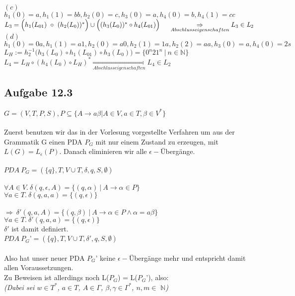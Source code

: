 \documentclass[11pt,a4paper]{article}
\begin{document}
$(c)$\\
$h_1(0) = a, h_1(1) = bb, h_2(0) = c, h_3(0) = a, h_4(0) = b, h_4(1) = cc$\\
$L_3 = \Big(h_1(L_{01}) ~ \circ ~ (h_2(L_0))^*\Big) \cup \Big((h_3(L_0))^* \circ h_4(L_{01})\Big) \\
\\
	~~~~ \underset{Abschlusseigenschaften} {\Rightarrow} L_3 \in \textit{L}_2$\\

$(d)$\\
$h_1(0) = 0a, h_1(1) = a1, h_2(0) = a0, h_2(1) = 1a, h_2(2) = aa, h_3(0) = a, h_4(0) = 2s$ \\
$L_H := h_2^{-1} \Big( h_3(L_0) \circ h_1(L_{01}) \circ h_3(L_0) \Big) = \Big\{0^n 2 1^n ~ | ~ n \in \mathbb N \Big\}$ \\
$L_4 = L_H \circ (h_4(L_0) \circ L_H)^* \underset{Abschlusseigenschaften} {\Rightarrow} L_4 \in \textit{L}_2$

\newpage

\subsection*{Aufgabe 12.3}
$G = (V, T, P, S), P \subseteq \{ A \rightarrow a\beta | A \in V, a \in T, \beta \in V^* \} $\\
\\
Zuerst benutzen wir das in der Vorlesung vorgestellte Verfahren um aus der Grammatik G einen 
PDA $P_G$ mit nur einem Zustand zu erzeugen, mit $L(G) = L_\epsilon(P)$. Danach eliminieren wir alle $\epsilon -$Übergänge. \\
\\
$PDA ~ P_G = ( \{q\}, T, V \cup T, \delta, q, S, \emptyset) $ \\
\\
$ \forall A \in V. ~ \delta(q,\epsilon,A) = \{(q,\alpha) ~ | ~ A \rightarrow \alpha \in P\} $ \\
$ \forall a \in T. ~ \delta(q,a,a) = \{(q,\epsilon)\} $ \\
\\
$ \Rightarrow ~ \delta'(q,a,A) = \{(q,\beta) ~ | ~ A \rightarrow \alpha \in P \wedge \alpha = a\beta \} $ \\
$ \forall a \in T. ~ \delta'(q,a,a) = \{(q,\epsilon)\} $ \\
$\delta'$ ist damit definiert.
\\
$PDA ~ P_G$'$ = ( \{q\}, T, V \cup T, \delta', q, S, \emptyset) $ \\
\\
Also hat unser neuer PDA $P_G$' keine $\epsilon -$Übergänge mehr und entspricht damit allen Voraussetzungen. \\
Zu Beweisen ist allerdings noch L($P_G$) = L($P_G$'), also: \\
{\itshape(Dabei sei $w \in T^*$, $a \in T$, $A \in \Gamma$, $\beta,\gamma \in \Gamma^*$, $n,m \in$} $\mathbb N$\textit)  \\
\end{document}
